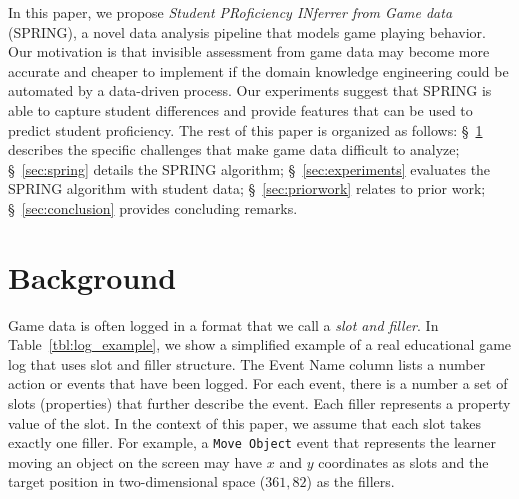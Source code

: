 \documentclass{sigchi}
\def\algname{SPRING\xspace}
\begin{document}
	
	In this paper, we propose \textit{Student PRoficiency INferrer from Game data} (SPRING), a novel data analysis pipeline that models game playing behavior.
	Our motivation is that invisible assessment from game data may become more accurate and cheaper to implement if the domain knowledge engineering could be automated by a data-driven process.
	Our experiments suggest that \algname is able to capture student differences and provide features that can be used to predict student proficiency.
	The rest of this paper is organized as follows:
	\S~\ref{sec:game_data} describes the specific challenges that make game data difficult to analyze;
	\S~\ref{sec:spring} details the SPRING algorithm;
	\S~\ref{sec:experiments} evaluates the SPRING algorithm with student data;
	\S~\ref{sec:priorwork} relates to prior work;
	\S~\ref{sec:conclusion} provides concluding remarks.
	
	
	\section{Background}
	\label{sec:game_data}
	Game data is often logged  in a format that we call a \textit{slot and filler}.
	In Table~\ref{tbl:log_example}, we show a simplified example of a real educational game log that uses slot and filler structure.
	The Event Name column lists a number action or events that have been logged.
	For each event, there is a number a set of slots (properties) that further describe the event.
	Each filler represents a property value of the slot.
	In the context of this paper, we assume that each slot takes exactly one filler.
	For example, a \texttt{Move Object} event  that represents the learner moving an object on the screen may have $x$ and $y$ coordinates as slots and the target position in two-dimensional space ($361, 82$) as the fillers.
	\newline
	
\end{document}
